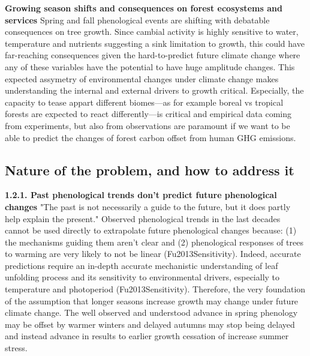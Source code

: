 \documentclass{article}
\begin{document}
\textbf{Growing season shifts and consequences on forest ecosystems and services}
Spring and fall phenological events are shifting with debatable consequences on tree growth. Since cambial activity is highly sensitive to water, temperature and nutrients suggesting a sink limitation to growth, this could have far-reaching consequences given the hard-to-predict future climate change where any of these variables have the potential to have huge amplitude changes. This expected assymetry of environmental changes under climate change makes understanding the internal and external drivers to growth critical. Especially, the capacity to tease appart different biomes---as for example boreal vs tropical forests are expected to react differently---is critical and empirical data coming from experiments, but also from observations are paramount if we want to be able to predict the changes of forest carbon offset from human GHG emissions.  

\subsection{Nature of the problem, and how to address it}

\textbf{1.2.1. Past phenological trends don't predict future phenological changes}
"The past is not necessarily a guide to the future, but it does partly help explain the present."
Observed phenological trends in the last decades cannot be used directly to extrapolate future phenological changes because: (1) the mechanisms guiding them aren't clear and (2) phenological responses of trees to warming are very likely to not be linear (Fu2013Sensitivity). Indeed, accurate predictions require an in-depth accurate mechanistic understanding of leaf unfolding process and its sensitivity to environmental drivers, especially to temperature and photoperiod (Fu2013Sensitivity). Therefore, the very foundation of the assumption that longer seasons increase growth may change under future climate change. The well observed and understood advance in spring phenology may be offset by warmer winters and delayed autumns may stop being delayed and instead advance in results to earlier growth cessation of increase summer stress. 
\end{document}
